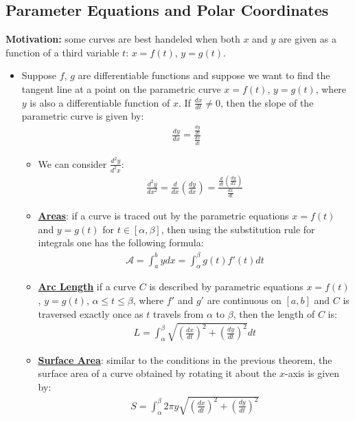 \documentclass[11pt]{article}
\newcommand{\dfn}[1]{\underline{\textbf{#1}}}
\begin{document}
\subsection{Parameter Equations and Polar Coordinates}
\textbf{Motivation:} some curves are best handeled when both $x$ and $y$ are given as a function of a third variable $t$: $x=f(t)$, $y=g(t)$. 
\begin{itemize}
	\item Suppose $f$, $g$ are differentiable functions and suppose we want to find the tangent line at a point on the parametric curve $x=f(t)$, $y=g(t)$, where $y$ is also a differentiable function of $x$. If $\frac{dx}{dt} \neq 0$, then the slope of the parametric curve is given by: 
	\begin{align}
		\frac{dy}{dx} = \frac{\frac{dy}{dt}}{\frac{dx}{dt}}	
	\end{align}
	\begin{itemize}[noitemsep]
		\item We can consider $\frac{d^2 y}{d^2x}$: 
		\begin{align}
			\frac{d^2 y}{dx^2} = \frac{d}{dx} \left( \frac{dy}{dx} \right) = \frac{\frac{d}{dt} \left( \frac{dy}{dx} \right)}{\frac{dx}{dt}}	
		\end{align}
	\item \dfn{Areas}: if a curve is traced out by the parametric equations $x = f(t)$ and $y=g(t)$ for $t \in [\alpha, \beta]$, then using the substitution rule for integrals one has the following formula: 
	\begin{align}
		\mathcal{A} = \int_a^b y dx = \int_\alpha^\beta g(t) f'(t) dt	
	\end{align}
	\item \dfn{Arc Length} if a curve $C$ is described by parametric equations $x = f(t)$, $y= g(t)$, $\alpha \leq t \leq \beta$, where $f'$ and $g'$ are continuous on $[a,b]$ and $C$ is traversed exactly once as $t$ travels from $\alpha$ to $\beta$, then the length of $C$ is: 
	\begin{align}
		L = \int_\alpha^\beta \sqrt{ \left( \frac{dx}{dt} \right)^2 + \left( \frac{dy}{dt} \right)^2} dt 	
	\end{align}
	\item \dfn{Surface Area}: similar to the conditions in the previous theorem, the surface area of a curve obtained by rotating it about the $x$-axis is given by: 
	\begin{align}
		S = \int_\alpha^\beta 2 \pi y \sqrt{ \left( \frac{dx}{dt} \right)^2 + \left( \frac{dy}{dt} \right)^2}	
	\end{align}


\end{itemize}
\end{itemize}
\end{document}

